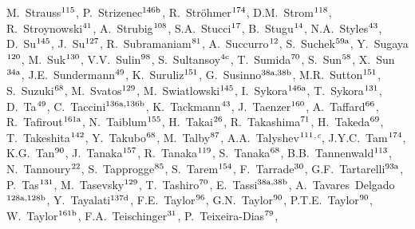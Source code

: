 \begin{flushleft}
M.~Strauss$^\textrm{\scriptsize 115}$,
P.~Strizenec$^\textrm{\scriptsize 146b}$,
R.~Str\"ohmer$^\textrm{\scriptsize 174}$,
D.M.~Strom$^\textrm{\scriptsize 118}$,
R.~Stroynowski$^\textrm{\scriptsize 41}$,
A.~Strubig$^\textrm{\scriptsize 108}$,
S.A.~Stucci$^\textrm{\scriptsize 17}$,
B.~Stugu$^\textrm{\scriptsize 14}$,
N.A.~Styles$^\textrm{\scriptsize 43}$,
D.~Su$^\textrm{\scriptsize 145}$,
J.~Su$^\textrm{\scriptsize 127}$,
R.~Subramaniam$^\textrm{\scriptsize 81}$,
A.~Succurro$^\textrm{\scriptsize 12}$,
S.~Suchek$^\textrm{\scriptsize 59a}$,
Y.~Sugaya$^\textrm{\scriptsize 120}$,
M.~Suk$^\textrm{\scriptsize 130}$,
V.V.~Sulin$^\textrm{\scriptsize 98}$,
S.~Sultansoy$^\textrm{\scriptsize 4c}$,
T.~Sumida$^\textrm{\scriptsize 70}$,
S.~Sun$^\textrm{\scriptsize 58}$,
X.~Sun$^\textrm{\scriptsize 34a}$,
J.E.~Sundermann$^\textrm{\scriptsize 49}$,
K.~Suruliz$^\textrm{\scriptsize 151}$,
G.~Susinno$^\textrm{\scriptsize 38a,38b}$,
M.R.~Sutton$^\textrm{\scriptsize 151}$,
S.~Suzuki$^\textrm{\scriptsize 68}$,
M.~Svatos$^\textrm{\scriptsize 129}$,
M.~Swiatlowski$^\textrm{\scriptsize 145}$,
I.~Sykora$^\textrm{\scriptsize 146a}$,
T.~Sykora$^\textrm{\scriptsize 131}$,
D.~Ta$^\textrm{\scriptsize 49}$,
C.~Taccini$^\textrm{\scriptsize 136a,136b}$,
K.~Tackmann$^\textrm{\scriptsize 43}$,
J.~Taenzer$^\textrm{\scriptsize 160}$,
A.~Taffard$^\textrm{\scriptsize 66}$,
R.~Tafirout$^\textrm{\scriptsize 161a}$,
N.~Taiblum$^\textrm{\scriptsize 155}$,
H.~Takai$^\textrm{\scriptsize 26}$,
R.~Takashima$^\textrm{\scriptsize 71}$,
H.~Takeda$^\textrm{\scriptsize 69}$,
T.~Takeshita$^\textrm{\scriptsize 142}$,
Y.~Takubo$^\textrm{\scriptsize 68}$,
M.~Talby$^\textrm{\scriptsize 87}$,
A.A.~Talyshev$^\textrm{\scriptsize 111}$$^{,c}$,
J.Y.C.~Tam$^\textrm{\scriptsize 174}$,
K.G.~Tan$^\textrm{\scriptsize 90}$,
J.~Tanaka$^\textrm{\scriptsize 157}$,
R.~Tanaka$^\textrm{\scriptsize 119}$,
S.~Tanaka$^\textrm{\scriptsize 68}$,
B.B.~Tannenwald$^\textrm{\scriptsize 113}$,
N.~Tannoury$^\textrm{\scriptsize 22}$,
S.~Tapprogge$^\textrm{\scriptsize 85}$,
S.~Tarem$^\textrm{\scriptsize 154}$,
F.~Tarrade$^\textrm{\scriptsize 30}$,
G.F.~Tartarelli$^\textrm{\scriptsize 93a}$,
P.~Tas$^\textrm{\scriptsize 131}$,
M.~Tasevsky$^\textrm{\scriptsize 129}$,
T.~Tashiro$^\textrm{\scriptsize 70}$,
E.~Tassi$^\textrm{\scriptsize 38a,38b}$,
A.~Tavares~Delgado$^\textrm{\scriptsize 128a,128b}$,
Y.~Tayalati$^\textrm{\scriptsize 137d}$,
F.E.~Taylor$^\textrm{\scriptsize 96}$,
G.N.~Taylor$^\textrm{\scriptsize 90}$,
P.T.E.~Taylor$^\textrm{\scriptsize 90}$,
W.~Taylor$^\textrm{\scriptsize 161b}$,
F.A.~Teischinger$^\textrm{\scriptsize 31}$,
P.~Teixeira-Dias$^\textrm{\scriptsize 79}$,
$$
\end{flushleft}
